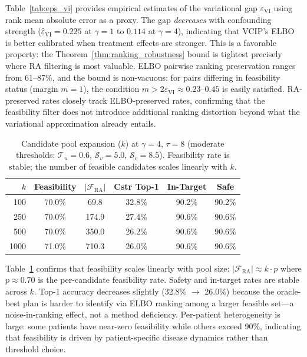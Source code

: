 \documentclass{article}
\newcommand{\cT}{\mathcal{T}}
\newcommand{\cS}{\mathcal{S}}
\newcommand{\cF}{\mathcal{F}}
\begin{document}
Table~\ref{tab:eps_vi} provides empirical estimates of the variational gap $\varepsilon_{\mathrm{VI}}$ using rank mean absolute error as a proxy. The gap \emph{decreases} with confounding strength ($\hat{\varepsilon}_{\mathrm{VI}} = 0.225$ at $\gamma = 1$ to $0.114$ at $\gamma = 4$), indicating that VCIP's ELBO is better calibrated when treatment effects are stronger. This is a favorable property: the Theorem~\ref{thm:ranking_robustness} bound is tightest precisely where RA filtering is most valuable. ELBO pairwise ranking preservation ranges from 61--87\%, and the bound is non-vacuous: for pairs differing in feasibility status (margin $m = 1$), the condition $m > 2\varepsilon_{\mathrm{VI}} \approx 0.23$--$0.45$ is easily satisfied. RA-preserved rates closely track ELBO-preserved rates, confirming that the feasibility filter does not introduce additional ranking distortion beyond what the variational approximation already entails.


\begin{table}[h]
\centering
\caption{Candidate pool expansion ($k$) at $\gamma = 4$, $\tau = 8$ (moderate thresholds: $\cT_u{=}0.6$, $\cS_v{=}5.0$, $\cS_c{=}8.5$). Feasibility rate is stable; the number of feasible candidates scales linearly with $k$.}
\label{tab:k_expansion}
\small
\begin{tabular}{r c c c c c}
\toprule
$k$ & Feasibility & $|\cF_{\mathrm{RA}}|$ & Cstr Top-1 & In-Target & Safe \\
\midrule
100  & 70.0\% & 69.8  & 32.8\% & 90.2\% & 90.2\% \\
250  & 70.0\% & 174.9 & 27.4\% & 90.6\% & 90.6\% \\
500  & 70.0\% & 350.0 & 26.2\% & 90.6\% & 90.6\% \\
1000 & 71.0\% & 710.3 & 26.0\% & 90.6\% & 90.6\% \\
\bottomrule
\end{tabular}
\end{table}

Table~\ref{tab:k_expansion} confirms that feasibility scales linearly with pool size: $|\cF_{\mathrm{RA}}| \approx k \cdot p$ where $p \approx 0.70$ is the per-candidate feasibility rate. Safety and in-target rates are stable across $k$. Top-1 accuracy decreases slightly (32.8\% $\to$ 26.0\%) because the oracle-best plan is harder to identify via ELBO ranking among a larger feasible set---a noise-in-ranking effect, not a method deficiency. Per-patient heterogeneity is large: some patients have near-zero feasibility while others exceed 90\%, indicating that feasibility is driven by patient-specific disease dynamics rather than threshold choice.
\end{document}

